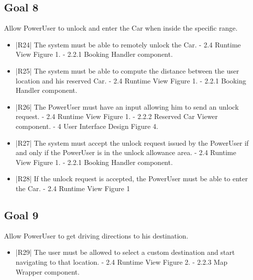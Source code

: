\subsection {Goal 8} Allow PowerUser to unlock and enter the Car when inside the specific range.
\begin{itemize}
 \item |R24| The system must be able to remotely unlock the Car.
    \newline - 2.4 Runtime View Figure 1.
    \newline - 2.2.1 Booking Handler component.
 \item |R25| The system must be able to compute the distance between the user location
and his reserved Car.
    \newline - 2.4 Runtime View Figure 1.
    \newline - 2.2.1 Booking Handler component.
 \item |R26| The PowerUser must have an input allowing him to send an unlock request.
    \newline - 2.4 Runtime View Figure 1.
    \newline - 2.2.2 Reserved Car Viewer component.
    \newline - 4 User Interface Design Figure 4.
 \item |R27| The system must accept the unlock request issued by the PowerUser if and only if the PowerUser is in the unlock allowance area.
    \newline - 2.4 Runtime View Figure 1.
    \newline - 2.2.1 Booking Handler component.
 \item |R28| If the unlock request is accepted, the PowerUser must be able to enter the Car.
\newline - 2.4 Runtime View Figure 1
\end{itemize}

\subsection {Goal 9} Allow PowerUser to get driving directions to his destination.
\begin{itemize} 
 \item |R29| The user must be allowed to select a custom destination and start navigating
to that location.
    \newline - 2.4 Runtime View Figure 2.
    \newline - 2.2.3 Map Wrapper component.
\end{itemize}

